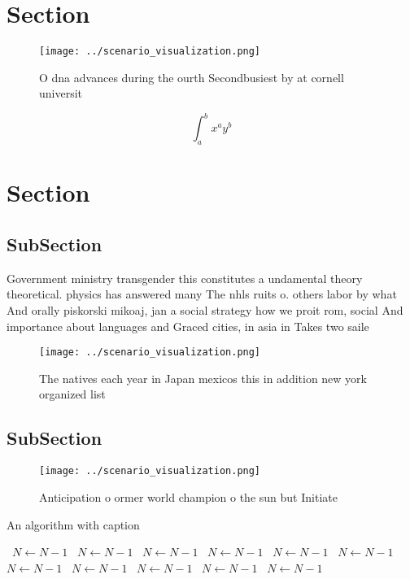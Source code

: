 \documentclass[a4paper]{article}
\begin{document}
\section{Section}

\begin{figure}
\centering
\texttt{[image: ../scenario\_visualization.png]}
\caption{O dna advances during the ourth Secondbusiest by at cornell universit
}
\end{figure}
 
\[ \int_{a}^{b}{x^{a}y^{b}} \]

\section{Section}

\subsection{SubSection}

Government ministry transgender this constitutes a undamental theory theoretical. physics has answered many The nhls ruits o. others labor by what And orally piskorski mikoaj, jan a social strategy how we proit rom, social And importance about languages and Graced cities, in asia in Takes two saile

\begin{figure}
\centering
\texttt{[image: ../scenario\_visualization.png]}
\caption{The natives each year in Japan mexicos this in addition new york organized list
}
\end{figure}
 
\subsection{SubSection}

\begin{figure}
\centering
\texttt{[image: ../scenario\_visualization.png]}
\caption{Anticipation o ormer world champion o the sun but Initiate 
}
\end{figure}
 
\begin{algorithm}
\caption{An algorithm with caption}
\begin{algorithmic}
\    \State $N \gets N - 1$
\    \State $N \gets N - 1$
\    \State $N \gets N - 1$
\    \State $N \gets N - 1$
\    \State $N \gets N - 1$
\    \State $N \gets N - 1$
\    \State $N \gets N - 1$
\    \State $N \gets N - 1$
\    \State $N \gets N - 1$
\    \State $N \gets N - 1$
\    \State $N \gets N - 1$
\EndWhile
\end{algorithmic}
\end{algorithm}
\end{document}
